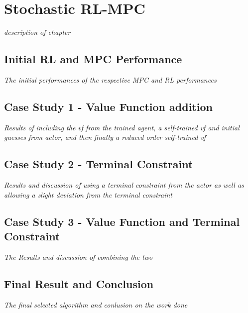 \chapter{Stochastic RL-MPC}
\label{chapter:stochastic_RL_MPC}

\emph{description of chapter}

\section{Initial RL and MPC Performance}
\emph{The initial performances of the respective MPC and RL performances}

\section{Case Study 1 - Value Function addition}
\emph{Results of including the vf from the trained agent, a self-trained vf and initial guesses from actor, and then finally a reduced order self-trained vf}

\section{Case Study 2 - Terminal Constraint}
\emph{Results and discussion of using a terminal constraint from the actor as well as allowing a slight deviation from the terminal constraint}

\section{Case Study 3 - Value Function and Terminal Constraint}
\emph{The Results and discussion of combining the two}


\section{Final Result and Conclusion}
\emph{The final selected algorithm and conlusion on the work done}